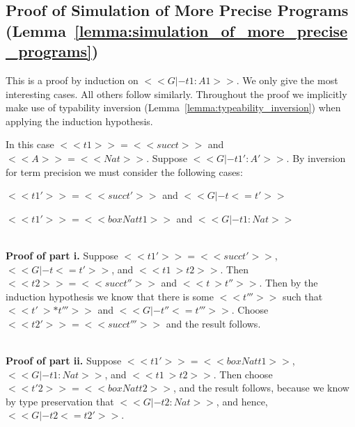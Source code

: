 \subsection{Proof of Simulation of More Precise Programs (Lemma~\ref{lemma:simulation_of_more_precise_programs})}
\label{subsec:proof_of_simulation_of_more_precise_programs_lemma:simulation_of_more_precise_programs}

  This is a proof by induction on $<<G |- t1 : A1>>$.  We only give the
most interesting cases.  All others follow similarly.  Throughout the
proof we implicitly make use of typability inversion
(Lemma~\ref{lemma:typeability_inversion}) when applying the induction
hypothesis.

\begin{description}
\item
  
  \noindent
  In this case $<<t1>> = <<succ t>>$ and $<<A>> = <<Nat>>$.  Suppose $<<G |- t1' : A'>>$.
  By inversion for term precision we must consider the following cases:
  \begin{enumR}
  \item $<<t1'>> = <<succ t'>>$ and $<<G |- t <= t'>>$
  \item $<<t1'>> = <<box Nat t1>>$ and $<<G |- t1 : Nat>>$    
  \end{enumR}

  \ \\
  \noindent
  \textbf{Proof of part i.}  Suppose $<<t1'>> = <<succ t'>>$, $<<G |- t <= t'>>$, and $<<t1 ~> t2>>$.
  Then $<<t2>> = <<succ t''>>$ and $<<t ~> t''>>$.  Then by the induction hypothesis
  we know that there is some $<<t'''>>$ such that $<<t' ~>* t'''>>$ and $<<G |- t'' <= t'''>>$.  Choose
  $<<t2'>> = <<succ t'''>>$ and the result follows.

  \ \\
  \noindent
  \textbf{Proof of part ii.} Suppose $<<t1'>> = <<box Nat t1>>$, $<<G |- t1 : Nat>>$, and $<<t1 ~> t2>>$.
  Then choose $<<t'2>> = <<box Nat t2>>$, and the result follows, because we know by type preservation
  that $<<G |- t2 : Nat>>$, and hence, $<<G |- t2 <= t2'>>$.

\item[]
\item
  

\end{description}
